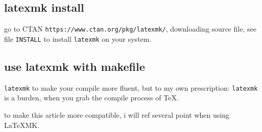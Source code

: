 \documentclass{article}
\begin{document}
\subsection{latexmk install}
go to CTAN \verb|https://www.ctan.org/pkg/latexmk/|, downloading 
source file, see file \verb|INSTALL| to install \verb|latexmk|
on your system.


\subsection{use latexmk with makefile}
\verb|latexmk| to make your compile more fluent, but to my 
own prescription: \verb|latexmk| is a burden, when you grab 
the compile process of \TeX{}.

to make this article more compatible, i will ref several point 
when using \LaTeX{}MK. 
\end{document}
